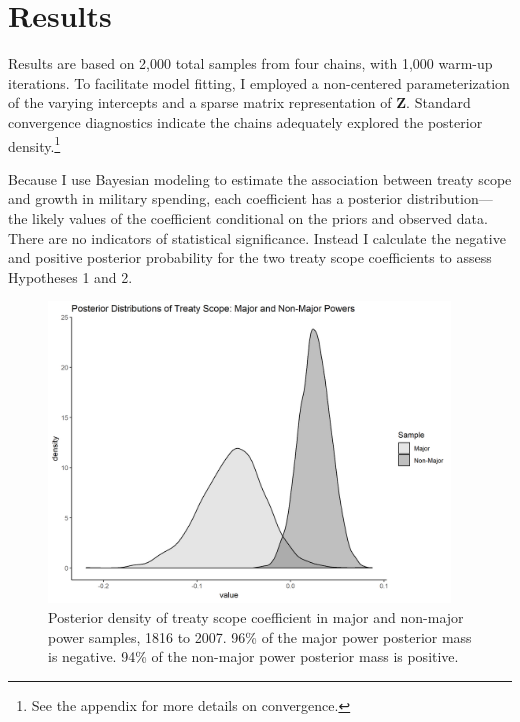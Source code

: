 \documentclass[12pt]{article}
\begin{document}
\section{Results}


Results are based on 2,000 total samples from four chains, with 1,000 warm-up iterations. 
To facilitate model fitting, I employed a non-centered parameterization of the varying intercepts and a sparse matrix representation of \textbf{Z}. 
Standard convergence diagnostics indicate the chains adequately explored the posterior density.\footnote{See the appendix for more details on convergence.} 


Because I use Bayesian modeling to estimate the association between treaty scope and growth in military spending, each coefficient has a posterior distribution--- the likely values of the coefficient conditional on the priors and observed data.
There are no indicators of statistical significance. 
Instead I calculate the negative and positive posterior probability for the two treaty scope coefficients to assess Hypotheses 1 and 2.


\begin{figure}[htbp]
	\centering
		\includegraphics[width=0.95\textwidth]{../figures/scope-dens-split.png}
	\caption{Posterior density of treaty scope coefficient in major and non-major power samples, 1816 to 2007. 96\% of the major power posterior mass is negative. 94\% of the non-major power posterior mass is positive.}
	\label{fig:str-dens}
\end{figure}
\end{document}
